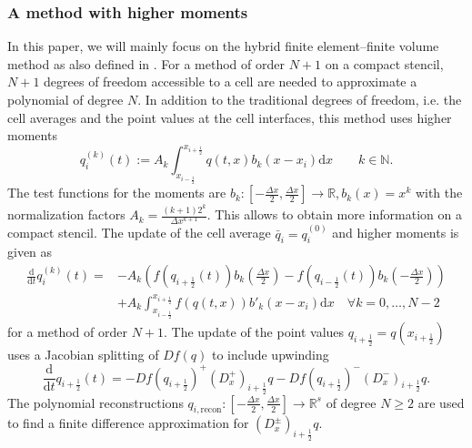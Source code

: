 \documentclass[12pt,a4paper]{article}
\begin{document}
\subsubsection{A method with higher moments}
\label{Chap_GenAF1dMoments}
In this paper, we will mainly focus on the hybrid finite element--finite volume method as also defined in \cite[Definition 4.1 (Method A)]{AB2023FEFV}. 
For a method of order $N+1$ on a compact stencil, $N+1$ degrees of freedom accessible to a cell are needed to approximate a polynomial of degree $N$. 
In addition to the traditional degrees of freedom, i.e. the cell averages and the point values at the cell interfaces, this method uses higher moments 
\begin{equation*}
	q_i^{(k)}(t) := A_k \int_{x_{i-\frac{1}{2}}}^{x_{i+\frac{1}{2}}} q(t, x) b_k(x-x_i) \mathrm d x  \qquad k \in \mathbb N.
\end{equation*}
The test functions for the moments are \(b_k: [-\frac{\Delta x}{2},\frac{\Delta x}{2}]\rightarrow \mathbb R, b_k(x) = x^k\) with the normalization factors \(A_k = \tfrac{(k+1)2^k}{\Delta x^{k+1}}\). This allows to obtain more information on a compact stencil. 
The update of the cell average $\bar q_i = q_i^{(0)}$ and higher moments is given as
\begin{align*}
	\frac{\mathrm d}{\mathrm d t} q_i^{(k)}(t) = &-A_k\left(f(q_{i+\frac{1}{2}}(t)) b_k\left(\tfrac{\Delta x}{2}\right) 
											- f(q_{i-\frac{1}{2}}(t))b_k\left(-\tfrac{\Delta x}{2}\right)\right)\\
								         &+ A_k \int_{x_{i-\frac{1}{2}}}^{x_{i+\frac{1}{2}}} f(q(t, x)) b'_k(x-x_i) \mathrm d x \quad \forall k = 0,\dots, N-2
\end{align*}
for a method of order \(N+1\). The update of the point values \(q_{i+\frac{1}{2}} = q(x_{i+\frac{1}{2}})\) uses a Jacobian splitting of $Df(q)$ to include upwinding
\begin{equation*}
	\frac{\mathrm d}{\mathrm d t} q_{i+\frac{1}{2}}(t) = -Df(q_{i+\frac{1}{2}})^+ (D_x^+)_{i+\frac{1}{2}}q - Df(q_{i+\frac{1}{2}})^- (D_x^-)_{i+\frac{1}{2}}q.
\end{equation*}
The polynomial reconstructions \(q_{i, \mathrm{recon}}:[-\frac{\Delta x}{2}, \frac{\Delta x}{2}] \rightarrow \mathbb R^s\) of degree $N \geq 2$ are used to find a finite difference approximation for \((D_x^\pm)_{i+\frac{1}{2}}q\).
\end{document}
